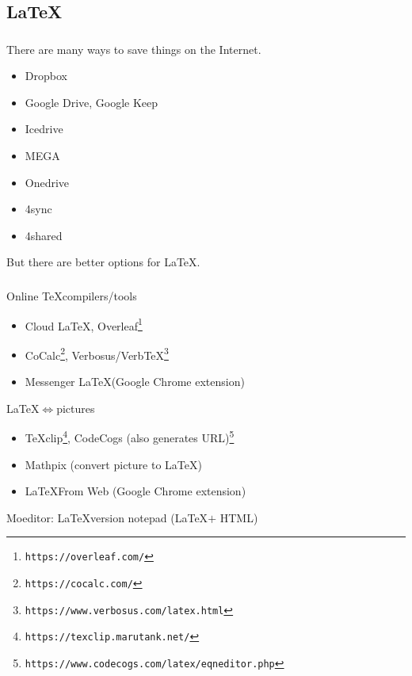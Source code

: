 \documentclass[dvipdfmx,10pt]{beamer}
\newcommand{\bb}{\begin{block}}
\newcommand{\eb}{\end{block}}
\newcommand{\ft}{\frametitle}
\newcommand{\bit}{\begin{itemize}}
\newcommand{\eit}{\end{itemize}}
\begin{document}
\subsection{\LaTeX}
\begin{frame}\ft{\insertsubsection}
There are many ways to save things on the Internet.
\bit
\item Dropbox
\item Google Drive, Google Keep
\item Icedrive
\item MEGA
\item Onedrive
\item 4sync
\item 4shared
\eit
But there are better options for \LaTeX.
\end{frame}
\begin{frame}\ft{\insertsubsection}
\footnotesize
\bb{\small Online \TeX \quad compilers/tools}
\bit
\item Cloud \LaTeX, Overleaf\footnote{\texttt{https://overleaf.com/}}
\item CoCalc\footnote{\texttt{https://cocalc.com/}}, Verbosus/VerbTeX\footnote{\texttt{https://www.verbosus.com/latex.html}}
\item Messenger \LaTeX (Google Chrome extension)
\eit
\eb
\bb{\small \LaTeX$\iff$pictures}
\bit
\item TeXclip\footnote{\texttt{https://texclip.marutank.net/}}, CodeCogs (also generates URL)\footnote{\texttt{https://www.codecogs.com/latex/eqneditor.php}}
\item Mathpix (convert picture to \LaTeX)
\item \LaTeX \quad From Web (Google Chrome extension)
\eit
\eb
Moeditor: \LaTeX \quad version notepad (\LaTeX $+$ HTML)
\normalsize
\end{frame}
\end{document}
